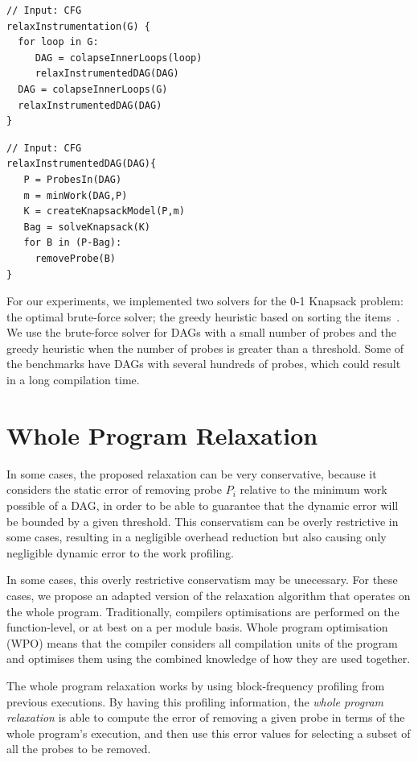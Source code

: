 \begin{lstlisting}[caption={Optimal placement of probes for block frequency.}, label={lst:instrumentCFG}]
// Input: CFG	
relaxInstrumentation(G) {
  for loop in G:
     DAG = colapseInnerLoops(loop)
     relaxInstrumentedDAG(DAG)
  DAG = colapseInnerLoops(G)
  relaxInstrumentedDAG(DAG)
}
\end{lstlisting}


\begin{lstlisting}[caption={Optimal placement of probes for block frequency.}, label={lst:instrumentCFG}]
// Input: CFG	
relaxInstrumentedDAG(DAG){
   P = ProbesIn(DAG)
   m = minWork(DAG,P)
   K = createKnapsackModel(P,m)
   Bag = solveKnapsack(K)
   for B in (P-Bag):
     removeProbe(B)
}
\end{lstlisting}

For our experiments, we implemented two solvers for the 0-1 Knapsack problem:
the optimal brute-force solver;
the greedy heuristic based on sorting the items~\citep{dantzig57}.
We use the brute-force solver for DAGs with a small number of probes and the greedy heuristic when the number of probes is greater than a threshold.
Some of the benchmarks have DAGs with several hundreds of probes, which could result in a long compilation time.

\section{Whole Program Relaxation}

In some cases, the proposed relaxation can be very conservative, because it considers the static error of removing probe $P_i$ relative to the minimum work possible of a DAG, in order to be able to guarantee that the dynamic error will be bounded by a given threshold.
This conservatism can be overly restrictive in some cases, resulting in a negligible overhead reduction but also causing only negligible dynamic error to the work profiling.

In some cases, this overly restrictive conservatism may be unecessary.
For these cases, we propose an adapted version of the relaxation algorithm that operates on the whole program.
Traditionally, compilers optimisations are performed on the function-level, or at best on a per module basis.
Whole program optimisation (WPO) means that the compiler considers all compilation units of the program and optimises them using the combined knowledge of how they are used together.

The whole program relaxation works by using block-frequency profiling from previous executions.
By having this profiling information, the \textit{whole program relaxation} is able to compute the error of removing a given probe in terms of the whole program's execution,
and then use this error values for selecting a subset of all the probes to be removed.

